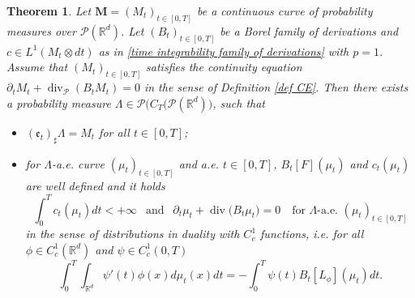 \documentclass[10pt,leqno]{amsart}
\numberwithin{equation}{section}
\newtheorem{teorema}{Theorem}[section]
\newcommand{\R}{\mathbb{R}}
\newcommand{\PP}{\mathcal{P}}
\begin{document}
\begin{teorema}\label{superposition principle}
    Let $\boldsymbol{M} = (M_t)_{t\in [0,T]}$ be a continuous curve of probability measures over $\mathcal{P}(\R^d)$. Let $(B_t)_{t\in[0,T]}$ be a Borel family of derivations and $c \in L^1(M_t\otimes dt)$ as in \eqref{time integrability family of derivations} with $p=1$.
    Assume that $(M_t)_{t\in[0,T]}$ satisfies the continuity equation $\partial_tM_t+\operatorname{div}_\PP(B_tM_t) = 0$ in the sense of Definition \ref{def CE}.
    Then there exists a probability measure $\Lambda \in \mathcal{P}\big( C_T(\mathcal{P}(\R^d) \big)$, such that 
    \begin{itemize}
        \item $(\mathfrak{e}_t)_{\sharp }\Lambda = M_t$ for all $t\in [0,T]$;
        \item for $\Lambda$-a.e. curve $(\mu_t)_{t\in [0,T]}$ and a.e. $t\in[0,T]$, $B_t[F](\mu_t)$ and $c_t(\mu_t)$ are well defined and it holds
        \begin{equation}\label{CE classic}
            \int_0^T c_t(\mu_t) dt<+\infty \ \ \text{ and } \ \ \partial_t\mu_t + \operatorname{div}\big( B_t \mu_t \big)= 0 \quad \text{for } \Lambda\text{-a.e. }(\mu_t)_{t\in[0,T]}
        \end{equation}
        in the sense of distributions in duality with $C_c^1$ functions, i.e. for all $\phi \in C_c^1(\R^d)$ and $\psi \in C_c^1(0,T)$
        \begin{equation}
            \int_0^T \int_{\R^d} \psi'(t) \phi(x) d\mu_t(x) dt = -\int_0^T \psi(t) B_t[L_{\phi}](\mu_t) dt. 
        \end{equation}
    \end{itemize}
\end{teorema}
\end{document}

